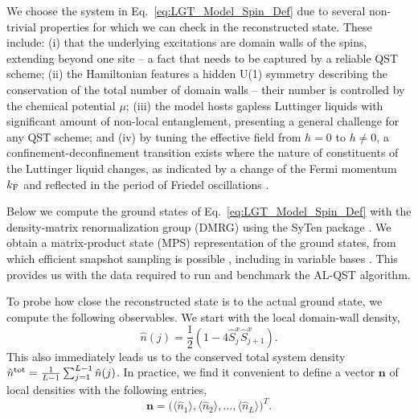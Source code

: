 \documentclass[pra,aps,showpacs,groupedaddress,superscriptaddress,twocolumn,toc=flat,biblatex,footinbib]{revtex4-1}
\renewcommand{\l}{\left(}
\renewcommand{\r}{\right)}
\renewcommand{\vec}[1]{\bm{#1}}
\begin{document}
We choose the system in Eq.~\eqref{eq:LGT_Model_Spin_Def} due to several non-trivial properties for which we can check in the reconstructed state. These include: (i) that the underlying excitations are domain walls of the spins, extending beyond one site -- a fact that needs to be captured by a reliable QST scheme; (ii) the Hamiltonian features a hidden U(1) symmetry describing the conservation of the total number of domain walls -- their number is controlled by the chemical potential $\mu$; (iii) the model hosts gapless Luttinger liquids with significant amount of non-local entanglement, presenting a general challenge for any QST scheme; and (iv) by tuning the effective field from $h=0$ to $h \neq 0$, a confinement-deconfinement transition exists where the nature of constituents of the Luttinger liquid changes, as indicated by a change of the Fermi momentum $k_{\rm F}$ and reflected in the period of Friedel oscillations \cite{Borla2020,Kebric2021}.

Below we compute the ground states of Eq.~\eqref{eq:LGT_Model_Spin_Def} with the density-matrix renormalization group (DMRG) using the SyTen package \cite{syten1,syten2}. We obtain a matrix-product state (MPS) representation of the ground states, from which efficient snapshot sampling is possible \cite{Ferris2012}, including in variable bases \cite{buser2021arXiv}. This provides us with the data required to run and benchmark the AL-QST algorithm.

To probe how close the reconstructed state is to the actual ground state, we compute the following observables. We start with the local domain-wall density,
\begin{equation}
    \hat{n}(j) = \frac{1}{2}
    \l 1 - 4 \hat{S}^{x}_{j}\hat{S}^{x}_{j+1} \r.
    \label{eq:LocalDensitySpinDef}
\end{equation}
This also immediately leads us to the conserved total system density $\hat{n}^{\rm tot} = \frac{1}{L-1} \sum_{j=1}^{L-1} \hat{n}(j)$. In practice, we find it convenient to define a vector $\vec{n}$ of local densities with the following entries,
\begin{equation}
    \vec{n} = \bigl( \langle \hat{n}_{1} \rangle, \langle \hat{n}_{2} \rangle, ..., \langle \hat{n}_{L} \rangle \bigr)^T.
\end{equation}
\end{document}

